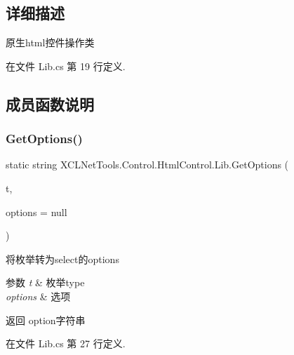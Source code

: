 \subsection{详细描述}
原生html控件操作类 



在文件 Lib.\+cs 第 19 行定义.



\subsection{成员函数说明}
\mbox{\label{class_x_c_l_net_tools_1_1_control_1_1_html_control_1_1_lib_a6bc535ff27a3e67b2c4dac1d5e99aa8c}} 
\subsubsection{\texorpdfstring{Get\+Options()}{GetOptions()}\hspace{0.1cm}{\footnotesize\ttfamily [1/2]}}
{\footnotesize\ttfamily static string X\+C\+L\+Net\+Tools.\+Control.\+Html\+Control.\+Lib.\+Get\+Options (\begin{DoxyParamCaption}\item[{Type}]{t,  }\item[{\hyperlink{class_x_c_l_net_tools_1_1_entity_1_1_set_option_entity}{Set\+Option\+Entity}}]{options = {\ttfamily null} }\end{DoxyParamCaption})\hspace{0.3cm}{\ttfamily [static]}}



将枚举转为select的options 
\begin{DoxyParams}{参数}
{\em t} & 枚举type\\
\hline
{\em options} & 选项\\
\hline
\end{DoxyParams}
\begin{DoxyReturn}{返回}
option字符串
\end{DoxyReturn}




在文件 Lib.\+cs 第 27 行定义.

